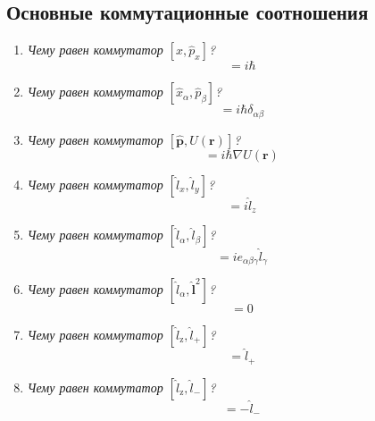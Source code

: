 \documentclass{article}
\begin{document}
\subsection*{Основные коммутационные соотношения}
\begin{enumerate}
	\item \textit{Чему равен коммутатор $[x,\hat{p}_{x}]$?}
	\begin{equation}
		[x,\hat{p}_{x}]=i\hbar
	\end{equation}
	\item \textit{Чему равен коммутатор $[\hat{x}_{\alpha},\hat{p}_{\beta}]$?}
	\begin{equation}
		[\hat{x}_{\alpha},\hat{p}_{\beta}]=i\hbar\delta_{\alpha\beta}
	\end{equation}
	\item \textit{Чему равен коммутатор $[\hat{\boldsymbol{p}},U(\boldsymbol{r})]$?}
	\begin{equation}
		[\hat{\boldsymbol{p}},U(\boldsymbol{r})]=i\hbar\nabla U(\boldsymbol{r})
	\end{equation}
	\item \textit{Чему равен коммутатор $[\hat{l}_{x},\hat{l}_{y}]$?}
	\begin{equation}
		[\hat{l}_{x},\hat{l}_{y}]=i\hat{l}_{z}
	\end{equation}
	\item \textit{Чему равен коммутатор $[\hat{l}_{\alpha},\hat{l}_{\beta}]$?}
	\begin{equation}
		[\hat{l}_{\alpha},\hat{l}_{\beta}]=ie_{\alpha\beta\gamma}\hat{l}_{\gamma}
	\end{equation}
	\item \textit{Чему равен коммутатор $[\hat{l}_{\alpha},\hat{\boldsymbol{l}}^{2}]$?}
	\begin{equation}
		[\hat{l}_{\alpha},\hat{\boldsymbol{l}}^{2}]=0
	\end{equation}
	\item \textit{Чему равен коммутатор $[\hat{l}_{\text{z}},\hat{l}_{+}]$?}
	\begin{equation}
		[\hat{l}_{\text{z}},\hat{l}_{+}]=\hat{l}_{+}
	\end{equation}
	\item \textit{Чему равен коммутатор $[\hat{l}_{\text{z}},\hat{l}_{-}]$?}
	\begin{equation}
		[\hat{l}_{\text{z}},\hat{l}_{-}]=-\hat{l}_{-}
	\end{equation}
\end{enumerate}
\end{document}
